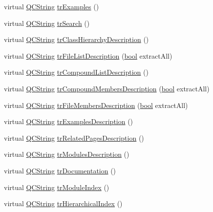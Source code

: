 \begin{DoxyCompactItemize}
virtual \hyperlink{class_q_c_string}{Q\+C\+String} \hyperlink{class_translator_greek_a75dd2ea0dc31e3738676cf56d598a479}{tr\+Examples} ()
\item 
virtual \hyperlink{class_q_c_string}{Q\+C\+String} \hyperlink{class_translator_greek_ad1b7dd119aac742f95d86e9af19664e7}{tr\+Search} ()
\item 
virtual \hyperlink{class_q_c_string}{Q\+C\+String} \hyperlink{class_translator_greek_a9848fe30201b92f324a145141406722f}{tr\+Class\+Hierarchy\+Description} ()
\item 
virtual \hyperlink{class_q_c_string}{Q\+C\+String} \hyperlink{class_translator_greek_a3da397b2bd5fd0a3e8055ff4ca6bbbe3}{tr\+File\+List\+Description} (\hyperlink{qglobal_8h_a1062901a7428fdd9c7f180f5e01ea056}{bool} extract\+All)
\item 
virtual \hyperlink{class_q_c_string}{Q\+C\+String} \hyperlink{class_translator_greek_a807afd594171efe507995437fecbe912}{tr\+Compound\+List\+Description} ()
\item 
virtual \hyperlink{class_q_c_string}{Q\+C\+String} \hyperlink{class_translator_greek_a6ac2639eb1841db2b53271e76cf0377c}{tr\+Compound\+Members\+Description} (\hyperlink{qglobal_8h_a1062901a7428fdd9c7f180f5e01ea056}{bool} extract\+All)
\item 
virtual \hyperlink{class_q_c_string}{Q\+C\+String} \hyperlink{class_translator_greek_aab12edf2228a59e9c419d18b66a35841}{tr\+File\+Members\+Description} (\hyperlink{qglobal_8h_a1062901a7428fdd9c7f180f5e01ea056}{bool} extract\+All)
\item 
virtual \hyperlink{class_q_c_string}{Q\+C\+String} \hyperlink{class_translator_greek_a49adb03bcbfb71c475a3668107ab787b}{tr\+Examples\+Description} ()
\item 
virtual \hyperlink{class_q_c_string}{Q\+C\+String} \hyperlink{class_translator_greek_a01064bad2a5ebc39a3efb3de5d92eba3}{tr\+Related\+Pages\+Description} ()
\item 
virtual \hyperlink{class_q_c_string}{Q\+C\+String} \hyperlink{class_translator_greek_a48ca418b3d81aa9616e661a8e111a1fc}{tr\+Modules\+Description} ()
\item 
virtual \hyperlink{class_q_c_string}{Q\+C\+String} \hyperlink{class_translator_greek_aa1cf992ba34da1bfa4a82b7eafdc0805}{tr\+Documentation} ()
\item 
virtual \hyperlink{class_q_c_string}{Q\+C\+String} \hyperlink{class_translator_greek_a5177542dcd2672621da881ca54bf5a96}{tr\+Module\+Index} ()
\item 
virtual \hyperlink{class_q_c_string}{Q\+C\+String} \hyperlink{class_translator_greek_ad5ae833189bc03970a6a6e89d1e467a8}{tr\+Hierarchical\+Index} ()

\end{DoxyCompactItemize}
